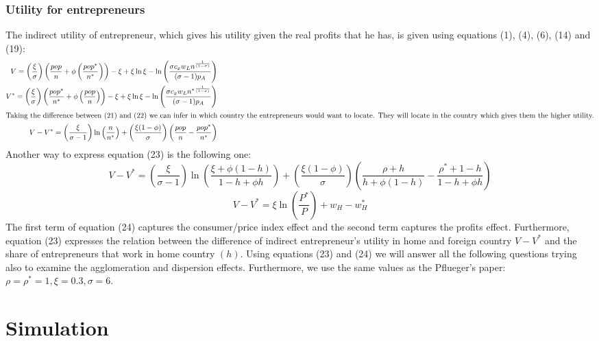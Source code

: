 \documentclass[11pt]{article}
\begin{document}
	\subsubsection{Utility for entrepreneurs}
	The indirect utility of entrepreneur, which gives his utility given the real profits that he has, is given using equations (1), (4), (6), (14) and (19):
\begin{align}
V=\left(\frac{\xi}{\sigma} \right) \left(\frac{pop}{n}+\phi \left(\frac{pop^\ast}{n{^\ast}}\right) \right)-\xi+\xi\ln\xi-\ln\left(\frac{\sigma c_{x} w_{L} n^{\frac{1}{(1-\sigma)}}}{(\sigma-1)p_{A}} \right) \\
V^{\ast}=\left(\frac{\xi}{\sigma} \right) \left(\frac{pop^\ast}{n{^\ast}} + \phi\left(\frac{pop}{n} \right)\right)-\xi+\xi\ln\xi-\ln\left(\frac{\sigma c_{x} w_{L} {n^{\ast}}^{\frac{1}{(1-\sigma)}}}{(\sigma-1)p_{A}} \right) \\
\intertext{Taking the difference between (21) and (22) we can infer in which country the entrepreneurs would want to locate. They will locate in the country which gives them the higher utility.}
V-V^{\ast}=\left( \frac{\xi}{\sigma-1} \right) \ln\left(\frac{n}{{n^\ast}} \right)+\left(\frac{\xi(1-\phi)}{\sigma} \right) \left(\frac{pop}{n}-\frac{pop^{\ast}}{n^{\ast}} \right) 
\end{align}
Another way to express equation (23) is the following one:
\begin{equation} \tag{23'}
V-V^{\ast}=\left( \frac{\xi}{\sigma-1} \right)\ln\left(\frac{\xi+ \phi(1-h)}{{1-h+\phi h}} \right)+\left(\frac{\xi(1-\phi)}{\sigma} \right) \left(\frac{\rho+h}{h+\phi(1-h)}- \frac{\rho^{\ast}+1-h}{1-h+\phi h} \right)
\end{equation}
\begin{equation} \tag{24}
V-V^{\ast}=\xi \ln \left(\frac{P^{\ast}}{P} \right)+w_{H}-w^{\ast}_{H} 
\end{equation}
The first term of equation (24) captures the consumer/price index effect and the second term captures the profits effect. Furthermore, equation (23) expresses the relation between the difference of indirect entrepreneur's utility in home and foreign country $V-V^{\ast}$ and the share of entrepreneurs that work in home country $(h)$. Using equations (23) and (24) we will answer all the following questions trying also to examine the agglomeration and dispersion effects. Furthermore, we use the same values as the Pflueger’s paper: $\rho=\rho^{\ast}=1, \xi=0.3, \sigma=6$.
\section{Simulation}
\end{document}
